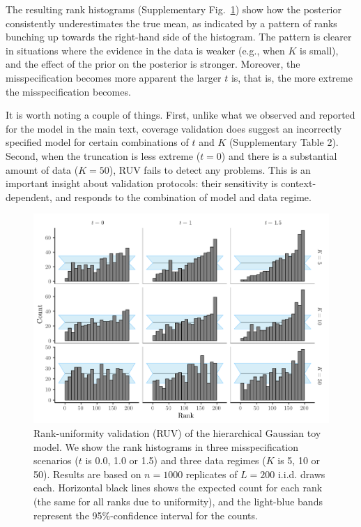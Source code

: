 \documentclass[oneside]{article}
\begin{document}
The resulting rank histograms (Supplementary Fig.~\ref{supfig:ruv_normal_toy}) show how the posterior consistently underestimates the true mean, as indicated by a pattern of ranks bunching up towards the right-hand side of the histogram.
The pattern is clearer in situations where the evidence in the data is weaker (e.g., when $K$ is small), and the effect of the prior on the posterior is stronger.
Moreover, the misspecification becomes more apparent the larger $t$ is, that is, the more extreme the misspecification becomes.

It is worth noting a couple of things.
First, unlike what we observed and reported for the model in the main text, coverage validation does suggest an incorrectly specified model for certain combinations of $t$ and $K$ (Supplementary Table 2).
Second, when the truncation is less extreme ($t = 0$) and there is a substantial amount of data ($K = 50$), RUV fails to detect any problems.
This is an important insight about validation protocols: their sensitivity is context-dependent, and responds to the combination of model and data regime.

\begin{figure}[!ht]
   \includegraphics[width=\linewidth]{../figures/sbc_normal_manual.pdf}
  \caption{Rank-uniformity validation (RUV) of the hierarchical Gaussian toy model.
  We show the rank histograms in three misspecification scenarios ($t$
  is 0.0, 1.0 or 1.5) and three data regimes ($K$ is 5, 10 or 50).
  Results are based on $n=1000$ replicates of $L= 200$ i.i.d. draws each.
  Horizontal black lines shows the expected count for each rank (the same for all ranks due to uniformity), and the light-blue bands represent the 95\%-confidence interval for the counts.
    }
  \label{supfig:ruv_normal_toy}
\end{figure}
\end{document}

